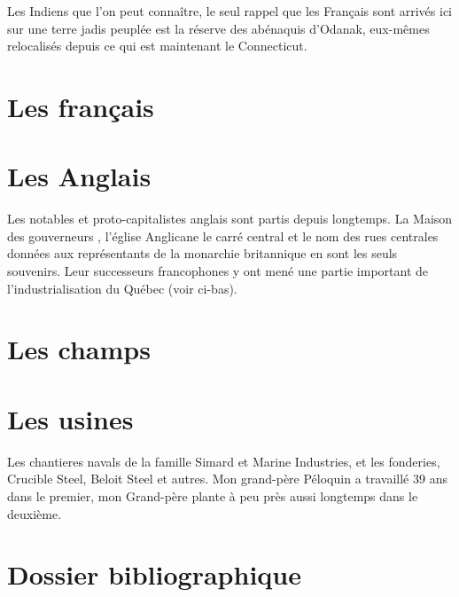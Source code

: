 \documentclass[12pt]{report}
\begin{document}
Les Indiens que l'on peut connaître, le seul rappel que les Français sont arrivés ici sur une terre jadis peuplée est la réserve des abénaquis d'Odanak, eux-mêmes relocalisés depuis ce qui est maintenant le Connecticut. 

\chapter{Les français}


\chapter{Les Anglais}

Les notables et proto-capitalistes anglais sont partis depuis longtemps. La \og Maison des gouverneurs \fg, l'église Anglicane le carré central et le nom des rues centrales données aux représentants de la monarchie britannique en sont les seuls souvenirs. Leur successeurs francophones y ont mené une partie important de l'industrialisation du Québec (voir ci-bas). 


\chapter{Les champs}


\chapter{Les usines}

Les chantieres navals de la famille Simard et Marine Industries, et les fonderies, Crucible Steel, Beloit Steel et autres. Mon grand-père Péloquin a travaillé 39 ans dans le premier, mon Grand-père plante à peu près aussi longtemps dans le deuxième. 


\appendix
\chapter*{Dossier bibliographique}
\end{document}
